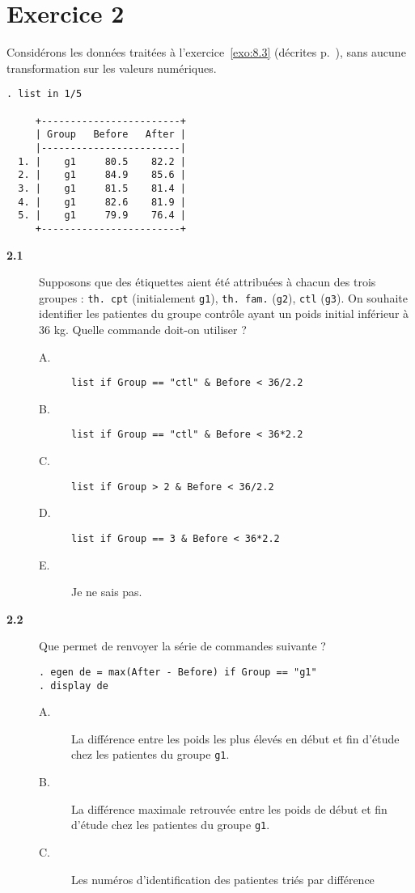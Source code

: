 \section*{Exercice 2}
Considérons les données traitées à l'exercice~\ref{exo:8.3} (décrites
p.~\pageref{exo:1.5}), sans aucune transformation sur les valeurs
numériques. 
\begin{verbatim}
. list in 1/5

     +------------------------+
     | Group   Before   After |
     |------------------------|
  1. |    g1     80.5    82.2 |
  2. |    g1     84.9    85.6 |
  3. |    g1     81.5    81.4 |
  4. |    g1     82.6    81.9 |
  5. |    g1     79.9    76.4 |
     +------------------------+
\end{verbatim}
\begin{description}
\item[\bf 2.1] Supposons que des étiquettes aient été attribuées à chacun
  des trois groupes : \texttt{th. cpt} (initialement \texttt{g1}),
  \texttt{th. fam.} (\texttt{g2}), \texttt{ctl} (\texttt{g3}). On souhaite
  identifier les patientes du groupe contrôle ayant un poids initial
  inférieur à 36 kg. Quelle commande doit-on utiliser ?
  \begin{description}
  \item[A.] \verb|list if Group == "ctl" & Before < 36/2.2|
  \item[B.] \verb|list if Group == "ctl" & Before < 36*2.2|
  \item[C.] \verb|list if Group > 2 & Before < 36/2.2|
  \item[D.] \verb|list if Group == 3 & Before < 36*2.2|
  \item[E.] Je ne sais pas.
  \end{description}  
\item[\bf 2.2] Que permet de renvoyer la série de commandes suivante ?
\begin{verbatim}
. egen de = max(After - Before) if Group == "g1"
. display de
\end{verbatim}
  \begin{description}
  \item[A.] La différence entre les poids les plus élevés en début et fin
    d'étude chez les patientes du groupe \texttt{g1}.    
  \item[B.] La différence maximale retrouvée entre les poids de début et fin
    d'étude chez les patientes du groupe \texttt{g1}.
  \item[C.] Les numéros d'identification des patientes triés par différence

\end{description}
\end{description}
